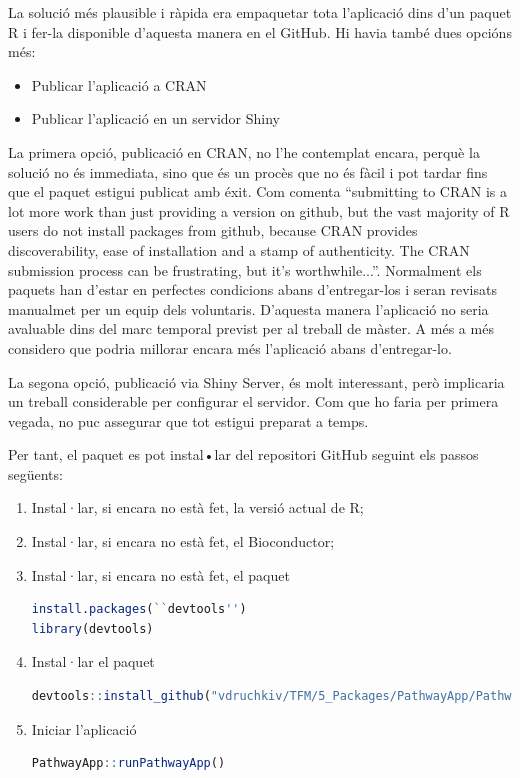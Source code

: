 \documentclass[]{article}
\begin{document}
La solució més plausible i ràpida era empaquetar tota l'aplicació dins d'un paquet R i fer-la disponible d'aquesta manera en el GitHub. Hi havia també dues opcións més: 

\begin{itemize}
\item Publicar l'aplicació a CRAN
\item Publicar l'aplicació en un servidor Shiny
\end{itemize}
La primera opció, publicació en CRAN, no l’he contemplat encara, perquè la solució no és immediata, sino que és un procès que no és fàcil i pot tardar fins que el paquet estigui
 publicat amb éxit. Com comenta \cite{HWick} \enquote{submitting to CRAN is a lot more work than just providing a version on github, but the vast majority of R users do not install packages from github, because CRAN provides discoverability, ease of installation and a stamp of authenticity. The CRAN submission process can be frustrating, but it’s worthwhile...}. Normalment els paquets han d’estar en perfectes condicions abans d'entregar-los i seran revisats manualmet per un equip dels voluntaris. D'aquesta manera l'aplicació no seria avaluable dins del marc temporal previst per al treball de màster. A més a més considero que podria millorar encara més l'aplicació abans d'entregar-lo.

La segona opció, publicació via Shiny Server, és molt interessant, però implicaria un treball considerable per configurar el servidor. Com que ho faria per primera vegada, no puc assegurar que tot estigui preparat a temps. 

Per tant, el paquet  es pot instal•lar del repositori GitHub seguint els passos següents:

\begin{enumerate}
\item Instal·lar, si encara no està fet, la versió actual de R;

\item Instal·lar, si encara no està fet, el Bioconductor;

\item Instal·lar, si encara no està fet, el paquet 

\begin{lstlisting}[language=R]
install.packages(``devtools'')
library(devtools)
\end{lstlisting}

\item Instal·lar el paquet 

\begin{lstlisting}[language=R]
devtools::install_github("vdruchkiv/TFM/5_Packages/PathwayApp/PathwayApp")
\end{lstlisting}

\item Iniciar l'aplicació 
\begin{lstlisting}[language=R]
PathwayApp::runPathwayApp()
\end{lstlisting}
\end{enumerate}
\end{document}
